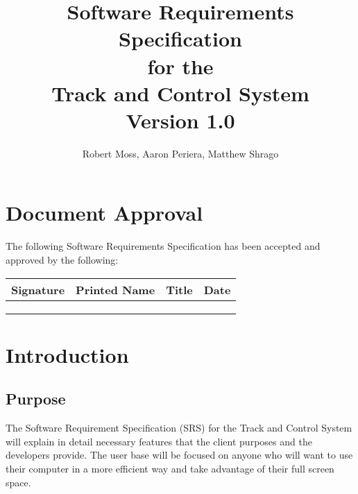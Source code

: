 \documentclass[titlepage]{article}
\begin{document}
\title{
\textbf{
Software Requirements Specification}
\protect\\
for the
\protect\\
\textbf{
Track and Control System}
\protect\\
{\small Version 1.0}}

\author{Robert Moss, Aaron Periera, Matthew Shrago}
\maketitle

\section*{Document Approval}

The following Software Requirements Specification has been accepted and approved by the following:

\begin{center}
    \begin{tabularx}{\textwidth}{ |X|X|X|X| }
    \hline
    \textbf{Signature} & \textbf{Printed Name} & \textbf{Title} & \textbf{Date} \\ \hline
     &  &  &  \\ \hline
     &  &  &  \\ \hline
     &  &  &  \\ \hline
    \end{tabularx}
\end{center}

\newpage
\tableofcontents{} 
\newpage

\section{Introduction}


\subsection{Purpose}
The Software Requirement Specification (SRS) for the Track and Control System will explain in detail necessary features that the client purposes and the developers provide. The user base will be focused on anyone who will want to use their computer in a more efficient way and take advantage of their full screen space. 
\end{document}

